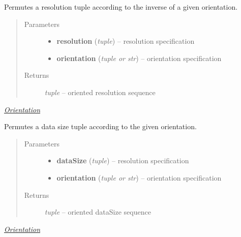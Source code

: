 \documentclass[letterpaper,10pt,english]{sphinxmanual}
\begin{document}
\begin{fulllineitems}
\label{api/ClearMap.Alignment:ClearMap.Alignment.Resampling.orientResolutionInverse}
Permutes a resolution tuple according to the inverse of a given orientation.
\begin{quote}\begin{description}
\item[{Parameters}] \leavevmode\begin{itemize}
\item {} 
\textbf{resolution} (\emph{tuple}) --
resolution specification

\item {} 
\textbf{orientation} (\emph{tuple or str}) --
orientation specification

\end{itemize}

\item[{Returns}] \leavevmode
\emph{tuple} --
oriented resolution sequence

\end{description}\end{quote}




{\hyperref[api/ClearMap.Alignment:orientation]{\emph{Orientation}}}



\end{fulllineitems}


\begin{fulllineitems}
\label{api/ClearMap.Alignment:ClearMap.Alignment.Resampling.orientDataSize}
Permutes a data size tuple according to the given orientation.
\begin{quote}\begin{description}
\item[{Parameters}] \leavevmode\begin{itemize}
\item {} 
\textbf{dataSize} (\emph{tuple}) --
resolution specification

\item {} 
\textbf{orientation} (\emph{tuple or str}) --
orientation specification

\end{itemize}

\item[{Returns}] \leavevmode
\emph{tuple} --
oriented dataSize sequence

\end{description}\end{quote}




{\hyperref[api/ClearMap.Alignment:orientation]{\emph{Orientation}}}



\end{fulllineitems}
\end{document}
